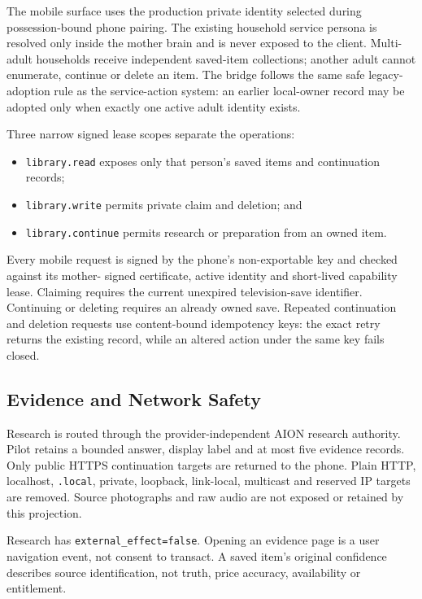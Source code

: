 The mobile surface uses the production private identity selected during possession-bound phone
pairing.  The existing household service persona is resolved only inside the mother brain and is
never exposed to the client.  Multi-adult households receive independent saved-item collections;
another adult cannot enumerate, continue or delete an item.  The bridge follows the same safe
legacy-adoption rule as the service-action system: an earlier local-owner record may be adopted
only when exactly one active adult identity exists.

Three narrow signed lease scopes separate the operations:
\begin{itemize}
  \item \texttt{library.read} exposes only that person's saved items and continuation records;
  \item \texttt{library.write} permits private claim and deletion; and
  \item \texttt{library.continue} permits research or preparation from an owned item.
\end{itemize}

Every mobile request is signed by the phone's non-exportable key and checked against its mother-
signed certificate, active identity and short-lived capability lease.  Claiming requires the
current unexpired television-save identifier.  Continuing or deleting requires an already owned
save.  Repeated continuation and deletion requests use content-bound idempotency keys: the exact
retry returns the existing record, while an altered action under the same key fails closed.

\subsection{Evidence and Network Safety}

Research is routed through the provider-independent AION research authority.  Pilot retains a
bounded answer, display label and at most five evidence records.  Only public HTTPS continuation
targets are returned to the phone.  Plain HTTP, localhost, \texttt{.local}, private, loopback,
link-local, multicast and reserved IP targets are removed.  Source photographs and raw audio are
not exposed or retained by this projection.

Research has \texttt{external\_effect=false}.  Opening an evidence page is a user navigation event,
not consent to transact.  A saved item's original confidence describes source identification, not
truth, price accuracy, availability or entitlement.

